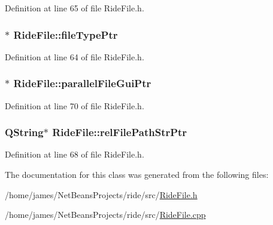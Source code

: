Definition at line 65 of file Ride\-File.\-h.

\hypertarget{class_ride_file_acdbc170d7f02d66dffb8b715609735c2}{
\subsubsection[{file\-Type\-Ptr}]{$\ast$ Ride\-File\-::file\-Type\-Ptr\hspace{0.3cm}{\ttfamily [private]}}}\label{class_ride_file_acdbc170d7f02d66dffb8b715609735c2}


Definition at line 64 of file Ride\-File.\-h.

\hypertarget{class_ride_file_ab2a6a17fda833b6e592968cde2aa18dc}{
\subsubsection[{parallel\-File\-Gui\-Ptr}]{$\ast$ Ride\-File\-::parallel\-File\-Gui\-Ptr\hspace{0.3cm}{\ttfamily [private]}}}\label{class_ride_file_ab2a6a17fda833b6e592968cde2aa18dc}


Definition at line 70 of file Ride\-File.\-h.

\hypertarget{class_ride_file_a47152ef70bd5486c4cbaa5c12e5346d4}{
\subsubsection[{rel\-File\-Path\-Str\-Ptr}]{\setlength{\rightskip}{0pt plus 5cm}Q\-String$\ast$ Ride\-File\-::rel\-File\-Path\-Str\-Ptr\hspace{0.3cm}{\ttfamily [private]}}}\label{class_ride_file_a47152ef70bd5486c4cbaa5c12e5346d4}


Definition at line 68 of file Ride\-File.\-h.



The documentation for this class was generated from the following files\-:\begin{DoxyCompactItemize}
\item 
/home/james/\-Net\-Beans\-Projects/ride/src/\hyperlink{_ride_file_8h}{Ride\-File.\-h}\item 
/home/james/\-Net\-Beans\-Projects/ride/src/\hyperlink{_ride_file_8cpp}{Ride\-File.\-cpp}\end{DoxyCompactItemize}
